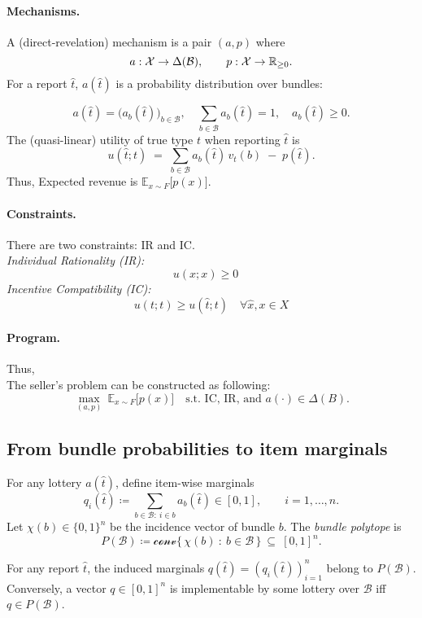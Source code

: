 \documentclass[dvipdfmx,autodetect-engine]{article}
\newcommand{\B}{\mathcal{B}}
\newcommand{\conv}{\mathcal{conv}}
\begin{document}
\paragraph{Mechanisms.}
A (direct-revelation) mechanism is a pair $(a,p)$ where
\[
    a:\mathcal{X}\to \Delta(\B),\qquad p:\mathcal{X}\to \R_{\ge 0}.
\]
For a report $\hat t$, $a(\hat t)$ is a probability distribution over bundles:

\[
    a(\hat t)=\big(a_b(\hat t)\big)_{b\in\B}, \quad
    \sum_{b\in\B}a_b(\hat t)=1, \quad
    a_b(\hat t)\ge 0.
\]
The (quasi-linear) utility of true type $t$ when reporting $\hat t$ is
\[
    u(\hat t;t)\;=\;\sum_{b\in\B} a_b(\hat t)\,v_t(b)\;-\;p(\hat t).
\]
Thus, Expected revenue is $\mathbb{E}_{x\sim F}\!\big[p(x)\big]$.

\paragraph{Constraints.}There are two constraints: IR and IC.\\
\emph{Individual Rationality (IR):} 
\[
u(x;x)\ge 0 \quad
\]
\emph{Incentive Compatibility (IC):} 
\[
u(t;t)\ge u(\hat t;t) \quad \forall \hat x, x\in X
\]

\paragraph{Program.}Thus, \\
The seller's problem can be constructed as following:
\[
\max_{(a,p)}\ \mathbb{E}_{x\sim F}\!\big[p(x)\big]\quad\text{s.t.\ IC, IR, and }a(\cdot)\in\Delta(B).
\]

\subsection*{From bundle probabilities to 
item marginals}
For any lottery $a(\hat t)$, define item-wise marginals
\[
q_i(\hat t)\coloneqq \sum_{b\in\B:\ i\in b} a_b(\hat t)\in[0,1],\qquad i=1,\dots,n.
\]
Let $\chi(b)\in\{0,1\}^n$ be the incidence vector of bundle $b$.
The \emph{bundle polytope} is
\[
P(\B)\coloneqq \conv\big\{\,\chi(b)\ :\ b\in\B\,\big\}\ \subseteq\ [0,1]^n.
\]

\begin{proposition}
For any report $\hat t$, the induced marginals $q(\hat t)=(q_i(\hat t))_{i=1}^n$ belong to $P(\B)$.
Conversely, a vector $q\in[0,1]^n$ is implementable by some lottery over $\B$ iff $q\in P(\B)$.
\end{proposition}
\end{document}
